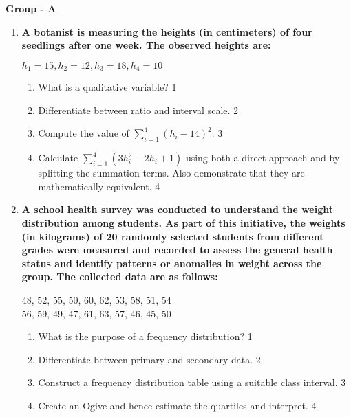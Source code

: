 \documentclass[12pt]{article}
\begin{document}
\begin{center}
\textbf{Group  - A}
\end{center}

  \begin{enumerate}
  
\item
\textbf{A botanist is measuring the heights (in centimeters) of four seedlings after one week. The observed heights are:}
\begin{center}
$h_1 = 15, h_2 = 12, h_3 = 18, h_4 = 10$
\end{center}
\begin{enumerate}
    \item What is a qualitative variable? \hfill 1
    \item Differentiate between ratio and interval scale. \hfill 2
    \item Compute the value of $\displaystyle \sum_{i=1}^4 (h_i - 14)^2$. \hfill 3
    \item Calculate $\displaystyle \sum_{i=1}^4 (3h_i^2 - 2h_i + 1)$ using both a direct approach and by splitting the summation terms. Also demonstrate that they are mathematically equivalent. \hfill 4
\end{enumerate}

  \item
  \textbf{A school health survey was conducted to understand the weight distribution among students. As part of this initiative, the weights (in kilograms) of 20 randomly selected students from different grades were measured and recorded to assess the general health status and identify patterns or anomalies in weight across the group. The collected data are as follows:}

  \begin{center}
  48, 52, 55, 50, 60, 62, 53, 58, 51, 54 \\
  56, 59, 49, 47, 61, 63, 57, 46, 45, 50 \\
  \end{center}

\begin{enumerate}
  \item What is the purpose of a frequency distribution? \hfill 1
  \item Differentiate between primary and secondary data. \hfill 2
  \item  
  Construct a frequency distribution table using a suitable class interval. \hfill 3

  \item
  Create an Ogive and hence estimate the quartiles and interpret. \hfill 4
\end{enumerate}



\end{enumerate}
\end{document}
